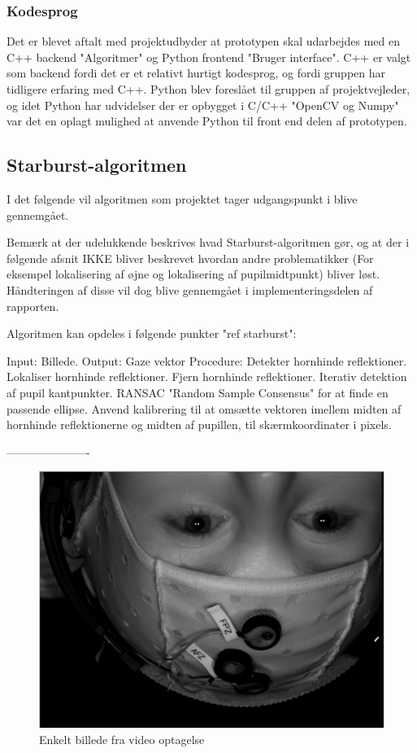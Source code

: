 \documentclass[a4paper,oneside,12pt]{article}
\begin{document}
	\subsubsection{Kodesprog}
	Det er blevet aftalt med projektudbyder at prototypen skal udarbejdes med en C++ backend "Algoritmer" og Python frontend "Bruger interface".
	C++ er valgt som backend fordi det er et relativt hurtigt kodesprog, og fordi gruppen har tidligere erfaring
	med C++. Python blev foreslået til gruppen af projektvejleder, og idet Python har udvidelser der er opbygget
	i C/C++ "OpenCV og Numpy" var det en oplagt mulighed at anvende Python til front end delen af prototypen.
	                           
	\subsection{Starburst-algoritmen}
	I det følgende vil algoritmen som projektet tager udgangspunkt i blive gennemgået.
	
	Bemærk at der udelukkende beskrives hvad Starburst-algoritmen gør, og at der i følgende afsnit IKKE bliver beskrevet hvordan andre problematikker (For eksempel lokalisering af øjne og lokalisering af pupilmidtpunkt) bliver løst. Håndteringen af disse vil dog blive gennemgået i implementeringsdelen af rapporten.
	
	Algoritmen kan opdeles i følgende punkter "ref starburst":
	
	Input: Billede.
	Output: Gaze vektor
	Procedure:
	Detekter hornhinde reflektioner.
	Lokaliser hornhinde reflektioner.
	Fjern hornhinde reflektioner.
	Iterativ detektion af pupil kantpunkter.
	RANSAC "Random Sample Consensus" for at finde en passende ellipse.
	Anvend kalibrering til at omsætte vektoren imellem midten af hornhinde reflektionerne og midten af pupillen, til skærmkoordinater i pixels.
	
	----------------------
	
	\begin{figure}
	\centering
	\includegraphics[width=0.4\linewidth]{Billeder/InitialImage.png}
	\caption{Enkelt billede fra video optagelse}
	\label{fig:InitialImage}
	\end{figure}
	
\end{document}
